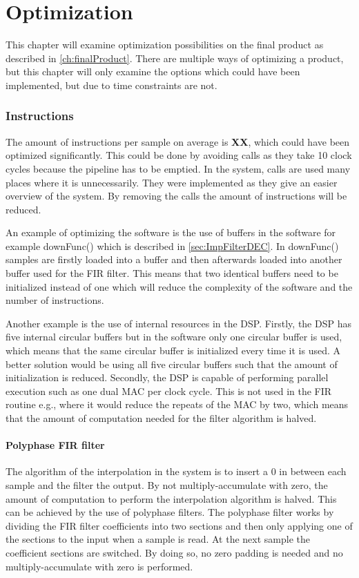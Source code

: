 \chapter{Optimization}
This chapter will examine optimization possibilities on the final product as described in \autoref{ch:finalProduct}. There are multiple ways of optimizing a product, but this chapter will only examine the options which could have been implemented, but due to time constraints are not. 

\subsection*{Instructions}
The amount of instructions per sample on average is \textbf{XX}, which could have been optimized significantly. This could be done by avoiding calls as they take 10 clock cycles  because the pipeline has to be emptied. In the system, calls are used many places where it is unnecessarily. They were implemented as they give an easier overview of the system. By removing the calls the amount of instructions will be reduced. 

An example of optimizing the software is the use of buffers in the software for example downFunc() which is described in \autoref{sec:ImpFilterDEC}. In downFunc() samples are firstly loaded into a buffer and then afterwards loaded into another buffer used for the FIR filter. This means that two identical buffers need to be initialized instead of one which will reduce the complexity of the software and the number of instructions. 

Another example is the use of internal resources in the DSP. Firstly, the DSP has five internal circular buffers but in the software only one circular buffer is used, which means that the same circular buffer is initialized every time it is used. A better solution would be using all five circular buffers such that the amount of initialization is reduced. Secondly, the DSP is capable of performing parallel execution such as one dual MAC per clock cycle. This is not used in the FIR routine e.g., where it would reduce the repeats of the MAC by two, which means that the amount of computation needed for the filter algorithm is halved.  

\subsubsection*{Polyphase FIR filter}
The algorithm of the interpolation in the system is to insert a 0 in between each sample and the filter the output. By not multiply-accumulate with zero, the amount of computation to perform the interpolation algorithm is halved. This can be achieved by the use of polyphase filters. The polyphase filter works by dividing the FIR filter coefficients into two sections and then only applying one of the sections to the input when a sample is read. At the next sample the coefficient sections are switched. By doing so, no zero padding is needed and no multiply-accumulate with zero is performed.

